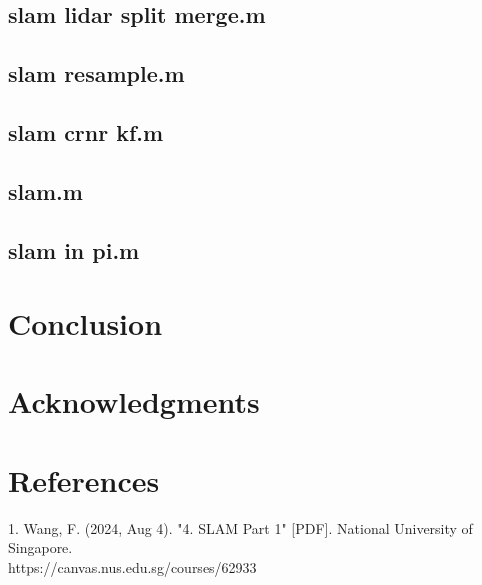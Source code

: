 \documentclass{rapport}
\begin{document}
\subsection{slam lidar split merge.m}


\subsection{slam resample.m}


\subsection{slam crnr kf.m}


\subsection{slam.m}


\subsection{slam in pi.m}


\pagebreak
\section{Conclusion}
\label{Conclusion}


\section*{Acknowledgments}
\label{Acknowledgements}


\section*{References}
1. Wang, F. (2024, Aug 4). "4. SLAM Part 1" [PDF]. National University of Singapore.\\
https://canvas.nus.edu.sg/courses/62933
\end{document}
